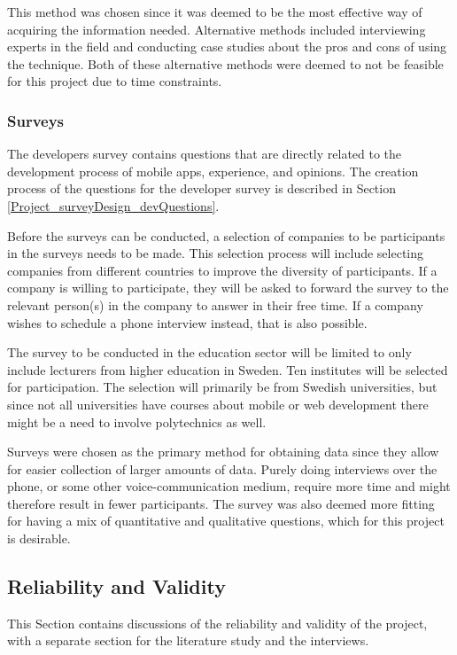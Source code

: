 \documentclass[a4paper,12pt]{article}
\begin{document}
This method was chosen since it was deemed to be the most effective way of acquiring the information needed. Alternative methods included interviewing experts in the field and conducting case studies about the pros and cons of using the technique. Both of these alternative methods were deemed to not be feasible for this project due to time constraints.

\subsubsection{Surveys}
\label{Method_methods_surveys}
The developers survey contains questions that are directly related to the development process of mobile apps, experience, and opinions. The creation process of the questions for the developer survey is described in Section \ref{Project_surveyDesign_devQuestions}.

Before the surveys can be conducted, a selection of companies to be participants in the surveys needs to be made. This selection process will include selecting companies from different countries to improve the diversity of participants. If a company is willing to participate, they will be asked to forward the survey to the relevant person(s) in the company to answer in their free time. If a company wishes to schedule a phone interview instead, that is also possible.

The survey to be conducted in the education sector will be limited to only include lecturers from higher education in Sweden. Ten institutes will be selected for participation. The selection will primarily be from Swedish universities, but since not all universities have courses about mobile or web development there might be a need to involve polytechnics as well.

Surveys were chosen as the primary method for obtaining data since they allow for easier collection of larger amounts of data. Purely doing interviews over the phone, or some other voice-communication medium, require more time and might therefore result in fewer participants. The survey was also deemed more fitting for having a mix of quantitative and qualitative questions, which for this project is desirable.

\subsection{Reliability and Validity}
\label{Method_reliabilityValidity}
This Section contains discussions of the reliability and validity of the project, with a separate section for the literature study and the interviews.
\end{document}
